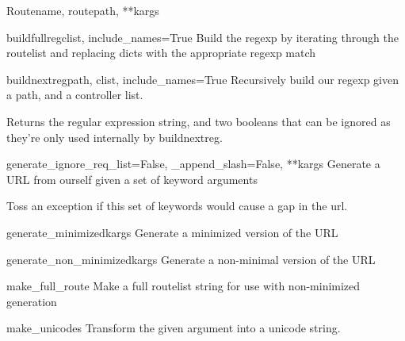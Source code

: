 \documentclass[letterpaper,10pt,english]{manual}
\begin{document}
\begin{classdesc}{Route}{name, routepath, **kargs}
\hypertarget{routes.route.Route.buildfullreg}{}\begin{methoddesc}{buildfullreg}{clist, include\_names=True}
Build the regexp by iterating through the routelist and
replacing dicts with the appropriate regexp match
\end{methoddesc}

\hypertarget{routes.route.Route.buildnextreg}{}\begin{methoddesc}{buildnextreg}{path, clist, include\_names=True}
Recursively build our regexp given a path, and a controller
list.

Returns the regular expression string, and two booleans that
can be ignored as they're only used internally by buildnextreg.
\end{methoddesc}

\hypertarget{routes.route.Route.generate}{}\begin{methoddesc}{generate}{\_ignore\_req\_list=False, \_append\_slash=False, **kargs}
Generate a URL from ourself given a set of keyword arguments

Toss an exception if this
set of keywords would cause a gap in the url.
\end{methoddesc}

\hypertarget{routes.route.Route.generate\_minimized}{}\begin{methoddesc}{generate\_minimized}{kargs}
Generate a minimized version of the URL
\end{methoddesc}

\hypertarget{routes.route.Route.generate\_non\_minimized}{}\begin{methoddesc}{generate\_non\_minimized}{kargs}
Generate a non-minimal version of the URL
\end{methoddesc}

\hypertarget{routes.route.Route.make\_full\_route}{}\begin{methoddesc}{make\_full\_route}{}
Make a full routelist string for use with non-minimized
generation
\end{methoddesc}

\hypertarget{routes.route.Route.make\_unicode}{}\begin{methoddesc}{make\_unicode}{s}
Transform the given argument into a unicode string.
\end{methoddesc}


\end{classdesc}
\end{document}
